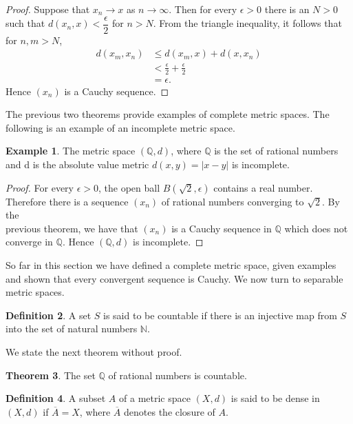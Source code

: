 \documentclass[11pt,a4paper]{article}
\theoremstyle{definition}
\newtheorem{thm}{Theorem}[subsection]
\newtheorem{defn}[thm]{Definition}
\newtheorem{exa}[thm]{Example}
\begin{document}
\begin{proof}
Suppose that $x_n\rightarrow x$ as $n\rightarrow \infty$. Then for every $\epsilon >0$ there is an $N>0$ such that $d(x_n,x)< \dfrac{\epsilon}{2}$ for $n>N$. From the triangle inequality, it follows that for $n,m>N$,
\begin{align*}
d(x_m,x_n) &\leq d(x_m,x)+d(x,x_n)\\
           &< \frac{\epsilon}{2} +\frac{\epsilon}{2}\\
           &=\epsilon.
\end{align*}       
Hence $(x_n)$ is a Cauchy sequence.
\end{proof}

The previous two theorems provide examples of complete metric spaces. The following is an example of an incomplete metric space.

\begin{exa}
The metric space $(\mathbb{Q},d)$, where $\mathbb{Q}$ is the set of rational numbers and d is the absolute value metric $d(x,y)=|x-y|$ is incomplete.
\end{exa}

\begin{proof}
For every $\epsilon >0$, the open ball $B(\sqrt{2},\epsilon)$ contains a real number. Therefore there is a sequence $(x_n)$ of rational numbers converging to $\sqrt{2}$. By the\\ previous theorem, we have that $(x_n)$ is a Cauchy sequence in $\mathbb{Q}$ which does not converge in $\mathbb{Q}$. Hence $(\mathbb{Q},d)$ is incomplete.
\end{proof}

So far in this section we have defined a complete metric space, given examples and shown that every convergent sequence is Cauchy. We now turn to separable metric spaces.


\begin{defn}
A set $S$ is said to be countable if there is an injective map from $S$ into the set of natural numbers $\mathbb{N}$.
\end{defn}

We state the next theorem without proof.

\begin{thm}
The set $\mathbb{Q}$ of rational numbers is countable.
\end{thm}

\begin{defn}
A subset $A$ of a metric space $(X,d)$ is said to be dense in $(X,d)$ if $\overline{A}=X$, where $\overline{A}$ denotes the closure of $A$.
\end{defn}
\end{document}
